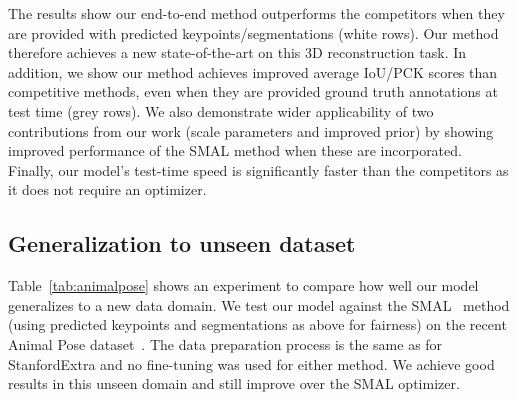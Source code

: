 The results show our end-to-end method outperforms the competitors when they are provided with predicted keypoints/segmentations (white rows). Our method therefore achieves a new state-of-the-art on this 3D reconstruction task. In addition, we show our method achieves improved average IoU/PCK scores than competitive methods, even when they are provided ground truth annotations at test time (grey rows). We also demonstrate wider applicability of two contributions from our work (scale parameters and improved prior) by showing improved performance of the SMAL method when these are incorporated. Finally, our model's test-time speed is significantly faster than the competitors as it does not require an optimizer.




\subsection{Generalization to unseen dataset}

Table~\ref{tab:animalpose} shows an experiment to compare how well our model generalizes to a new data domain. We test our model against the SMAL~\cite{zuffi2017menagerie} method (using predicted keypoints and segmentations as above for fairness) on the recent Animal Pose dataset~\cite{animalpose}. The data preparation process is the same as for StanfordExtra and no fine-tuning was used for either method. We achieve good results in this unseen domain and still improve over the SMAL optimizer.

